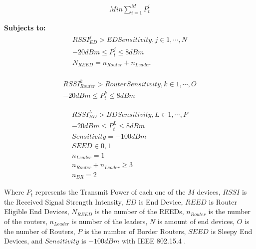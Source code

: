 \begin{equation}\label{eq:minimize_power}
    \begin{aligned}
        Min\sum_{i=1}^{M}P_t^i
    \end{aligned}
\end{equation}

\textbf{Subjects to:}
\begin{equation}\label{eq:mathematical_constraints_end_device}
    \begin{split}
        RSSI_{ED}^j>EDSensitivity,j\in1,\cdots,N \\
        -20dBm{\le P}_t^j\le8dBm \\
        N_{REED}=n_{Router}+n_{Leader} \\
    \end{split}
\end{equation}

\begin{equation}\label{eq:mathematical_constraints_router}
    \begin{split}
        {RSSI}_{Router}^k>RouterSensitivity,k\in1,\cdots,O \\
        -{20dBm\le P}_t^k\le8dBm
    \end{split}
\end{equation}

\begin{equation}\label{eq:mathematical_constraints_border_router}
    \begin{split}
        {RSSI}_{BD}^L>BDSensitivity,L\in1,\cdots,P \\
        -{20dBm\le P}_t^L\le8dBm \\
        Sensitivity=-100dBm \\
        SEED\in0,1 \\
        n_{Leader}=1 \\
        n_{Router}+n_{Leader}\geq3 \\
        n_{BR}=2
    \end{split}
\end{equation}

Where $P_t$ represents the Transmit Power of each one of the $M$ devices, $RSSI$ is the Received Signal Strength Intensity, $ED$ is End Device, $REED$ is Router Eligible End Devices, $N_{REED}$ is the number of the REEDs, $n_{Router}$ is the number of the routers, $n_{Leader}$ is number of the leaders, $N$ is amount of end devices, $O$ is the number of Routers, $P$ is the number of Border Routers, $SEED$ is Sleepy End Devices, and $Sensitivity$ is $-100 dBm$ with IEEE 802.15.4 \cite{Semiconductor_Nordic_Product_Brief_2018_2.0}.

